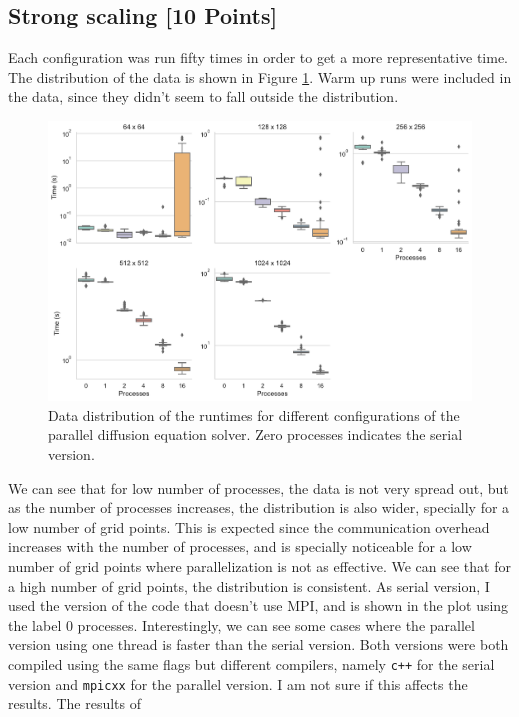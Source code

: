 \documentclass[unicode,11pt,a4paper,oneside,numbers=endperiod,openany]{scrartcl}
\begin{document}
\subsection{Strong scaling [10 Points]}
Each configuration was run fifty times in order to get a more representative
time. The distribution of the data is shown in Figure \ref{fig:data}. Warm up
runs were included in the data, since they didn't seem to fall outside the distribution.
\begin{figure}[h!]
    \centering
    \includegraphics[width=\textwidth]{../mini_app/data_var_strong.pdf}
    \caption{Data distribution of the runtimes for different configurations of
    the parallel diffusion equation solver. Zero processes indicates the serial version.}
    \label{fig:data}
\end{figure}
We can see that for low number of processes, the data is not very spread out,
but as the number of processes increases, the distribution is also wider,
specially for a low number of grid points. 
This is expected since the
communication overhead increases with the number of processes, and is specially
noticeable for a low number of grid points where parallelization is not as
effective. We can see that for a high number of grid points, the distribution
is consistent. 
As serial version, I used the version of the code that doesn't use MPI, and is
shown in the plot using the label $0$ processes. 
Interestingly, we can see some cases
where the parallel version using one thread is faster than the serial version.
Both versions
were both compiled using the same flags but different compilers, namely \texttt{c++} for
the serial version and \texttt{mpicxx} for the parallel version. I am not sure if this
affects the results.
The results of
\end{document}
